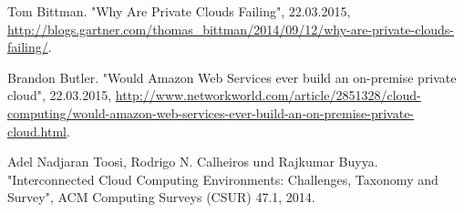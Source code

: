 \begin{thebibliography}{1}
Tom Bittman. "Why Are Private Clouds Failing", 22.03.2015, \url{http://blogs.gartner.com/thomas_bittman/2014/09/12/why-are-private-clouds-failing/}.

Brandon Butler. "Would Amazon Web Services ever build an on-premise private cloud", 22.03.2015, \url{http://www.networkworld.com/article/2851328/cloud-computing/would-amazon-web-services-ever-build-an-on-premise-private-cloud.html}.

Adel Nadjaran Toosi, Rodrigo N. Calheiros und Rajkumar Buyya. "Interconnected Cloud Computing Environments: Challenges, Taxonomy and Survey", ACM Computing Surveys (CSUR) 47.1, 2014.

\end{thebibliography}